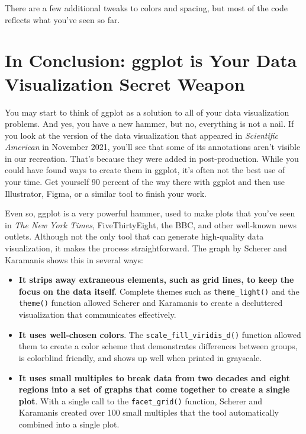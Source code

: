 \documentclass[
]{book}
\begin{document}
There are a few additional tweaks to colors and spacing, but most of the code reflects what you've seen so far.

\hypertarget{in-conclusion-ggplot-is-your-data-visualization-secret-weapon}{%
\section*{In Conclusion: ggplot is Your Data Visualization Secret Weapon}\label{in-conclusion-ggplot-is-your-data-visualization-secret-weapon}}

You may start to think of ggplot as a solution to all of your data visualization problems. And yes, you have a new hammer, but no, everything is not a nail. If you look at the version of the data visualization that appeared in \emph{Scientific American} in November 2021, you'll see that some of its annotations aren't visible in our recreation. That's because they were added in post-production. While you could have found ways to create them in ggplot, it's often not the best use of your time. Get yourself 90 percent of the way there with ggplot and then use Illustrator, Figma, or a similar tool to finish your work.

Even so, ggplot is a very powerful hammer, used to make plots that you've seen in \emph{The New York Times}, FiveThirtyEight, the BBC, and other well-known news outlets. Although not the only tool that can generate high-quality data visualization, it makes the process straightforward. The graph by Scherer and Karamanis shows this in several ways:

\begin{itemize}
\item
  \textbf{It strips away extraneous elements, such as grid lines, to keep the focus on the data itself}. Complete themes such as \texttt{theme\_light()} and the \texttt{theme()} function allowed Scherer and Karamanis to create a decluttered visualization that communicates effectively.
\item
  \textbf{It uses well-chosen colors}. The \texttt{scale\_fill\_viridis\_d()} function allowed them to create a color scheme that demonstrates differences between groups, is colorblind friendly, and shows up well when printed in grayscale.
\item
  \textbf{It uses small multiples to break data from two decades and eight regions into a set of graphs that come together to create a single plot}. With a single call to the \texttt{facet\_grid()} function, Scherer and Karamanis created over 100 small multiples that the tool automatically combined into a single plot.
\end{itemize}
\end{document}
